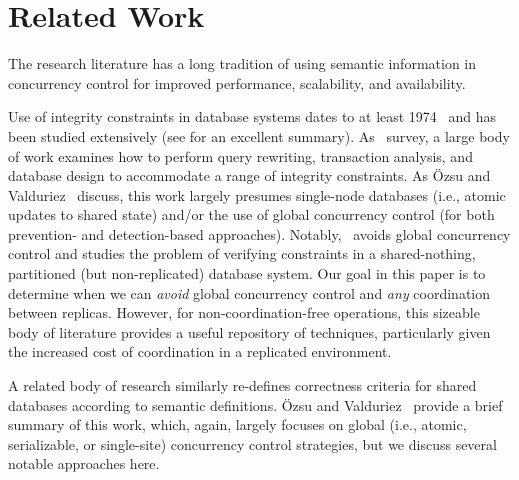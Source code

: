 
\section{Related Work}
\label{sec:relatedwork}

The research literature has a long tradition of using semantic
information in concurrency control for improved performance,
scalability, and availability.


 Use of integrity constraints in
database systems dates to at least 1974~\cite{florentin-constraints}
and has been studied extensively (see \cite{tamer-book} for an
excellent summary). As~\cite{ic-survey,ic-survey-two} survey, a large
body of work examines how to perform query rewriting, transaction
analysis, and database design to accommodate a range of integrity
constraints. As \"{O}zsu and Valduriez~\cite{tamer-book} discuss, this
work largely presumes single-node databases (i.e., atomic updates to
shared state) and/or the use of global concurrency control (for both
prevention- and detection-based
approaches). Notably,~\cite{local-verification} avoids global
concurrency control and studies the problem of verifying constraints
in a shared-nothing, partitioned (but non-replicated) database
system. Our goal in this paper is to determine when we can
\textit{avoid} global concurrency control and \textit{any}
coordination between replicas. However, for non-coordination-free
operations, this sizeable body of literature provides a useful
repository of techniques, particularly given the increased cost of
coordination in a replicated environment.


 A related body of
research similarly re-defines correctness criteria for shared
databases according to semantic definitions. \"{O}zsu and
Valduriez~\cite{tamer-book} provide a brief summary of this work,
which, again, largely focuses on global (i.e., atomic, serializable,
or single-site) concurrency control strategies, but we discuss several
notable approaches here.

